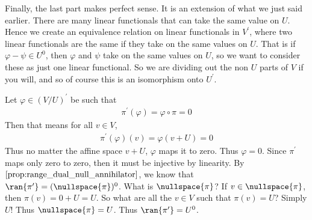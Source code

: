 \documentclass{book}
\begin{document}
\begin{enumerate}[label=\arabic*)]
      Finally, the last part makes perfect sense. It is an extension of what we just said earlier. There are many linear functionals that can take the same value on $U$. Hence we create an
      equivalence relation on linear functionals in $V^{\prime}$, where two linear functionals are the same if they take on the same values on $U$. That is if $\varphi - \psi \in U^0$, then
      $\varphi$ and $\psi$ take on the same values on $U$, so we want to consider these as just one linear functional. So we are dividing out the non $U$ parts of $V$ if you will, and so of
      course this is an isomorphism onto $U^{\prime}$.
    \ii
      \begin{enumerate}[label=\alph*)]
        \ii 
          Let $\varphi \in (V/U)^{\prime}$ be such that
          \begin{align*}
            \pi^{\prime}(\varphi) = \varphi \circ \pi = 0
          \end{align*}
          Then that means for all $v \in V$,
          \begin{align*}
            \pi^{\prime}(\varphi)(v) = \varphi(v + U) = 0
          \end{align*}
          Thus no matter the affine space $v + U$, $\varphi$ maps it to zero. Thus $\varphi = 0$. Since $\pi^{\prime}$ maps only zero to zero, then it must be injective by linearity. 
        \ii
        By $\eqref{prop:range_dual_null_annihilator}$, we know that $\ran{\pi^{\prime}} = (\nullspace{\pi})^0$. What is $\nullspace{\pi}$? If $v \in \nullspace{\pi}$, then $\pi(v) = 0 + U =
        U$. So what are all the $v \in V$ such that $\pi(v) = U$? Simply $U$! Thus $\nullspace{\pi} = U$. Thus $\ran{\pi^{\prime}} = U^0$.


\end{enumerate}
\end{enumerate}
\end{document}
